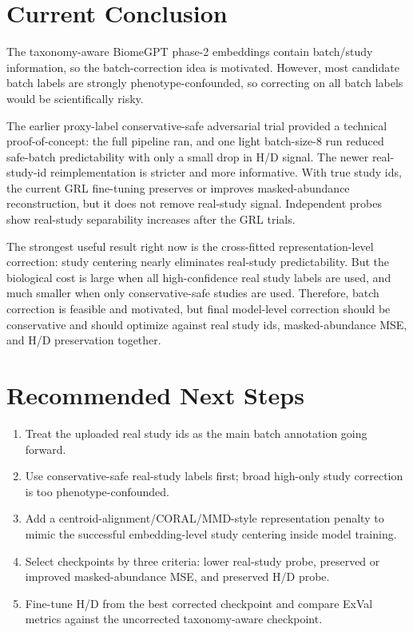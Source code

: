 \documentclass[11pt]{article}
\begin{document}
\section{Current Conclusion}

The taxonomy-aware BiomeGPT phase-2 embeddings contain batch/study information, so the
batch-correction idea is motivated. However, most candidate batch labels are strongly
phenotype-confounded, so correcting on all batch labels would be scientifically risky.

The earlier proxy-label conservative-safe adversarial trial provided a technical
proof-of-concept: the full pipeline ran, and one light batch-size-8 run reduced safe-batch
predictability with only a small drop in H/D signal. The newer real-study-id
reimplementation is stricter and more informative. With true study ids, the current GRL
fine-tuning preserves or improves masked-abundance reconstruction, but it does not remove
real-study signal. Independent probes show real-study separability increases after the
GRL trials.

The strongest useful result right now is the cross-fitted representation-level correction:
study centering nearly eliminates real-study predictability. But the biological cost is
large when all high-confidence real study labels are used, and much smaller when only
conservative-safe studies are used. Therefore, batch correction is feasible and motivated,
but final model-level correction should be conservative and should optimize against real
study ids, masked-abundance MSE, and H/D preservation together.

\section{Recommended Next Steps}

\begin{enumerate}
  \item Treat the uploaded real study ids as the main batch annotation going forward.
  \item Use conservative-safe real-study labels first; broad high-only study correction is
  too phenotype-confounded.
  \item Add a centroid-alignment/CORAL/MMD-style representation penalty to mimic the
  successful embedding-level study centering inside model training.
  \item Select checkpoints by three criteria: lower real-study probe, preserved or improved
  masked-abundance MSE, and preserved H/D probe.
  \item Fine-tune H/D from the best corrected checkpoint and compare ExVal metrics against
  the uncorrected taxonomy-aware checkpoint.
\end{enumerate}
\end{document}
